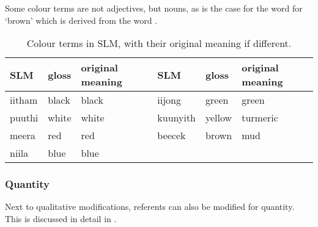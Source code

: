Some colour terms are not adjectives, but nouns, as is the case for the word for `brown' which is derived from the word .



\begin{table}
\begin{center}
\begin{tabular}{llllll}
SLM & gloss  & original meaning & SLM  & gloss  & original meaning \\
\hline
iitham & black & black & iijong & green & green \\
puuthi & white & white & kuunyith & yellow & turmeric\footnotemark \\
meera & red & red & beecek & brown & mud \\
niila & blue & blue &  &  &  \\
\end{tabular}
\end{center}
\caption[Colour terms]{Colour terms in SLM, with their original meaning if different.}
\label{tab:func:colourterms}
\end{table}





\subsubsection{Quantity}\label{sec:func:mod:Quantity}
Next to qualitative modifications, referents can also be modified for quantity. This is discussed in detail in   .

